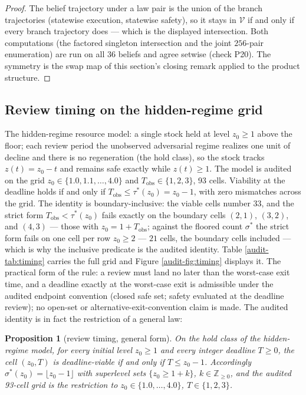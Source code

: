 \documentclass[10pt,twocolumn]{article}
\theoremstyle{plain}
\newtheorem{proposition}[theorem]{Proposition}
\theoremstyle{definition}
\theoremstyle{remark}
\begin{document}
\begin{proof}
The belief trajectory under a law pair is the union of the branch
trajectories (statewise execution, statewise safety), so it stays in
\(\mathcal{V}\) if and only if every branch trajectory does --- which is
the displayed intersection. Both computations (the factored singleton
intersection and the joint \(256\)-pair enumeration) are run on all
\(36\) beliefs and agree setwise (check P20). The symmetry is the swap
map of this section's closing remark applied to the product structure.
\end{proof}

\subsection{Review timing on the hidden-regime grid}\label{audit-timing}

The hidden-regime resource model: a single stock held at level
\(z_0 \ge 1\) above the floor; each review period the unobserved
adversarial regime realizes one unit of decline and there is no
regeneration (the hold class), so the stock tracks \(z(t) = z_0 - t\)
and remains safe exactly while \(z(t) \ge 1\). The model is audited on
the grid \(z_0 \in \{1.0, 1.1, \dots, 4.0\}\) and
\(T_{\mathrm{obs}} \in \{1, 2, 3\}\), 93 cells. Viability at the
deadline holds if and only if
\(T_{\mathrm{obs}} \le \tau^{*}(z_0) = z_0 - 1\), with zero
mismatches across the grid. The identity is boundary-inclusive: the
viable cells number \(33\), and the strict form \(T_{\mathrm{obs}} <
\tau^{*}(z_0)\) fails exactly on the boundary cells \((2,1)\),
\((3,2)\), and \((4,3)\) --- those with \(z_0 = 1 +
T_{\mathrm{obs}}\); against the floored count \(\sigma^{*}\) the
strict form fails on one cell per row \(z_0 \ge 2\) --- \(21\) cells,
the boundary cells included --- which is why the
inclusive predicate is the audited identity.
Table \ref{audit-tab:timing} carries the full grid and Figure
\ref{audit-fig:timing} displays it. The practical form of the rule: a review
must land no later than the worst-case exit time, and a deadline exactly at the worst-case exit is admissible under the audited endpoint convention (closed safe set; safety evaluated at the deadline review); no open-set or alternative-exit-convention claim is made. The audited identity is in fact the
restriction of a general law:

\begin{proposition}[review timing, general form]\label{audit-prop:timing}
On the hold class of the hidden-regime model, for every initial level
\(z_0 \ge 1\) and every integer deadline \(T \ge 0\), the cell
\((z_0, T)\) is deadline-viable if and only if \(T \le z_0 - 1\).
Accordingly \(\sigma^{*}(z_0) = \lfloor z_0 - 1 \rfloor\) with
superlevel sets \(\{z_0 \ge 1 + k\}\), \(k \in
\mathbb{Z}_{\ge 0}\), and the audited 93-cell grid is the restriction
to \(z_0 \in \{1.0, \dots, 4.0\}\), \(T \in \{1, 2, 3\}\).
\end{proposition}
\end{document}
